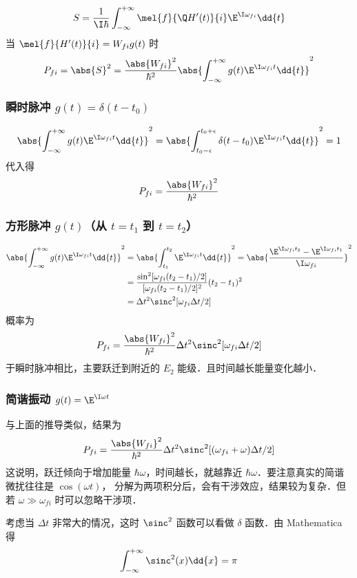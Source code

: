 
\begin{equation}
S = \frac{1}{\I\hbar} \int_{-\infty}^{+\infty} \mel{f}{\Q H'(t)}{i} \E^{\I\omega_{fi}} \dd{t}
\end{equation}
当 $\mel{f}{H'(t)}{i} = W_{fi} g(t)$ 时
\begin{equation}
P_{fi} = \abs{S}^2 = \frac{\abs{W_{fi}}^2}{\hbar^2} \abs{\int_{-\infty}^{+\infty} g(t) \E^{\I\omega_{fi} t} \dd{t}}^2
\end{equation}

\subsubsection{瞬时脉冲 $g(t) = \delta(t-t_0)$}
\begin{equation}
\abs{\int_{-\infty}^{+\infty} g(t) \E^{\I\omega_{fi} t} \dd{t}}^2
= \abs{\int_{t_0-\epsilon}^{t_0+\epsilon} \delta(t-t_0) \E^{\I\omega_{fi} t} \dd{t}}^2
= 1
\end{equation}
代入得
\begin{equation}
P_{fi} = \frac{\abs{W_{fi}}^2}{\hbar^2}
\end{equation}

\subsubsection{方形脉冲 $g(t)$（从 $t=t_1$ 到 $t=t_2$）}
\begin{equation}\begin{aligned}
\abs{\int_{-\infty}^{+\infty} g(t) \E^{\I\omega_{fi}t} \dd{t}}^2
&= \abs{\int_{t_1}^{t_2} \E^{\I\omega_{fi}t} \dd{t}}^2
= \abs{\frac{\E^{\I\omega_{fi}t_2} - \E^{\I\omega_{fi}t_1}}{\I\omega_{fi}}}^2\\
&= \frac{\sin^2[\omega_{fi}(t_2-t_1)/2]}{[\omega_{fi}(t_2-t_1)/2]^2} (t_2-t_1)^2 \\
&= \Delta t^2 \sinc^2[\omega_{fi}\Delta t/2]
\end{aligned}\end{equation}
概率为
\begin{equation}
P_{fi} = \frac{\abs{W_{fi}}^2}{\hbar^2} \Delta t^2 \sinc^2[\omega_{fi}\Delta t/2]
\end{equation}
于瞬时脉冲相比，主要跃迁到附近的 $E_2$ 能级．且时间越长能量变化越小．

\subsubsection{简谐振动 $g(t)= \E^{\I\omega t}$}
与上面的推导类似，结果为
\begin{equation}
P_{fi} = \frac{\abs{W_{fi}}^2}{\hbar^2} \Delta t^2 \sinc^2[(\omega_{fi}+\omega)\Delta t/2]
\end{equation}
这说明，跃迁倾向于增加能量 $\hbar\omega$，时间越长，就越靠近 $\hbar\omega$．要注意真实的简谐微扰往往是 $\cos(\omega t)$， 分解为两项积分后，会有干涉效应，结果较为复杂．但若 $\omega \gg \omega_{fi}$ 时可以忽略干涉项．

考虑当 $\Delta t$ 非常大的情况，这时 $\sinc^2$ 函数可以看做 $\delta$ 函数．由 Mathematica 得
\begin{equation}
\int_{-\infty}^{+\infty} \sinc^2(x) \dd{x} = \pi
\end{equation}



 

